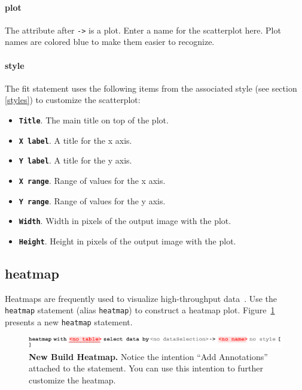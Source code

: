 \paragraph{plot}
The attribute after \texttt{->} is a plot. Enter a name for the scatterplot here. Plot names are colored blue to make them easier to recognize.

\paragraph{style}
The fit statement uses the following items from the associated style (see section \ref{styles}) to customize the scatterplot:
\begin{itemize}
\item \textbf{ \texttt{Title}}. The main title on top of the plot.
\item \textbf{ \texttt{X label}}. A title for the x axis.
\item \textbf{ \texttt{Y label}}. A title for the y axis.
\item \textbf{ \texttt{X range}}. Range of values for the x axis.
\item \textbf{ \texttt{Y range}}. Range of values for the y axis.
\item \textbf{ \texttt{Width}}. Width in pixels of the output image with the plot.
\item \textbf{ \texttt{Height}}. Height in pixels of the output image with the plot. 
\end{itemize}

\subsection{heatmap}
Heatmaps are frequently used to visualize high-throughput data~\cite{Cook2007}. Use the \texttt{heatmap} statement (alias \texttt{heatmap}) to construct a heatmap plot. Figure~\ref{fig:NewBuildHeatmap} presents a new \texttt{heatmap} statement.

\begin{figure}[h!tbp]
  \centering
  \includegraphics[width=\figWidthWide]{figures/NewBuildHeatmap.pdf}
\caption[New Heatmap.]{\textbf{New Build Heatmap.} Notice the intention ``Add Annotations'' attached to the statement. You can use this intention to further customize the heatmap.}
\label{fig:NewBuildHeatmap}
\end{figure}

